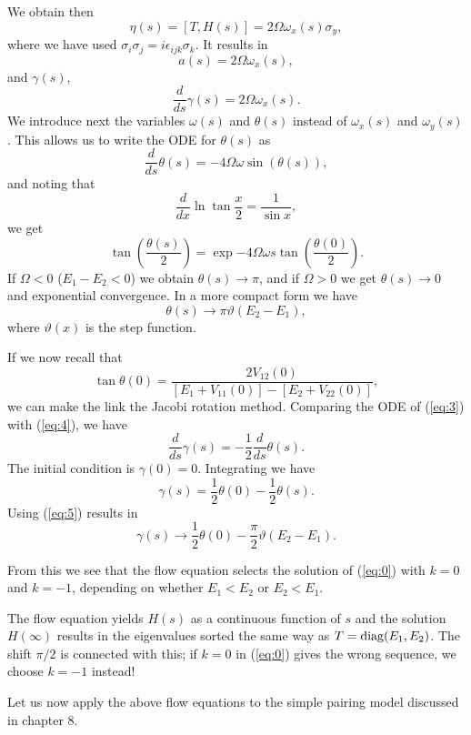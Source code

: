We obtain then
\[ \eta(s) = [T, H(s)] = 2\Omega\omega_x(s)\sigma_y, \]
where we have used $\sigma_i\sigma_j = i\epsilon_{ijk}\sigma_k$.
It results in
\[ a(s) = 2\Omega \omega_x(s), \]
and $\gamma(s)$,
\begin{equation} \frac{d}{ds} \gamma(s) = 2\Omega\omega_x(s). \label{eq:3}\end{equation}
We introduce next the  variables $\omega(s)$ and $\theta(s)$ instead of
$\omega_x(s)$ and $\omega_y(s)$. This allows us to write the ODE 
for $\theta(s)$ as
\begin{equation} 
\frac{d}{ds} \theta(s) = -4\Omega\omega \sin(\theta(s)), \label{eq:4}
\end{equation}
and noting that
\[ 
\frac{d}{dx} \ln \tan \frac{x}{2} = \frac{1}{\sin x}, 
\]
we get
\[ 
\tan\left(\frac{\theta(s)}{2}\right) = \exp{-4\Omega\omega s} \tan\left(
  \frac{\theta(0)}{2}\right). 
\]
If $\Omega<0$ ($E_1-E_2<0$) we obtain  $\theta(s)\rightarrow \pi$, and if 
$\Omega>0$ we get  $\theta(s)\rightarrow 0$ and exponential convergence. In a more 
compact form we have
\begin{equation} \theta(s) \rightarrow \pi \vartheta(E_2 - E_1),
  \label{eq:5} \end{equation}
where $\vartheta(x)$ is the  step function.

If we now recall that 
\[ \tan \theta(0) = \frac{2 V_{12}(0) }{[E_1 + V_{11}(0)]- [E_2 +
  V_{22}(0)]},
\]
we can make the link the Jacobi rotation method. Comparing the  ODE of (\ref{eq:3}) with 
(\ref{eq:4}), we have
\[ \frac{d}{ds} \gamma(s) = -\frac{1}{2} \frac{d}{ds} \theta(s). \]
The initial condition is 
$\gamma(0) = 0$. Integrating we have
\[ \gamma(s) = \frac{1}{2}\theta(0) - \frac{1}{2}\theta(s). \]
Using (\ref{eq:5}) results in 
\[ \gamma(s) \rightarrow \frac{1}{2}\theta(0) -
\frac{\pi}{2}\vartheta(E_2-E_1). \]

From this we see that the flow equation selects the solution of (\ref{eq:0}) with
$k=0$ and $k=-1$, depending on whether  $E_1<E_2$ or $E_2<E_1$.

The flow equation yields $H(s)$ as a continuous function of $s$ and the solution
$H(\infty)$ results in the eigenvalues sorted the same way as
$T = \operatorname{diag}(E_1,E_2)$. The shift $\pi/2$ is connected with this; if $k=0$ in 
(\ref{eq:0}) gives the wrong sequence, we choose $k=-1$ instead!

Let us now apply the above flow equations to the simple pairing model discussed in chapter 8. 

